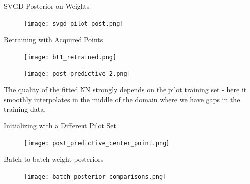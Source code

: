 \documentclass[usenames,dvipsnames,aspectratio=169]{beamer}
\theoremstyle{definition}
\begin{document}
\begin{frame}{SVGD Posterior on Weights}
    \begin{figure}
        \centering
        \texttt{[image: svgd\_pilot\_post.png]}        
    \end{figure}
\end{frame}

\begin{frame}{Retraining with Acquired Points}
    \begin{figure}
        \centering
        \texttt{[image: bt1\_retrained.png]}        
    \end{figure}
\end{frame}

\begin{frame}{}
    \begin{figure}
        \centering
        \texttt{[image: post\_predictive\_2.png]}        
    \end{figure}


The quality of the fitted NN strongly depends on the pilot training set - here it smoothly interpolates in the middle of the domain where we have gaps in the training data.
\end{frame}

\begin{frame}{Initializing with a Different Pilot Set}
    \begin{figure}[H]
        \texttt{[image: post\_predictive\_center\_point.png]}
    \end{figure}
\end{frame}

\begin{frame}{Batch to batch weight posteriors}
    \begin{figure}
        \centering

        \texttt{[image: batch\_posterior\_comparisons.png]}        
    \end{figure}
\end{frame}


    




    
\end{document}
